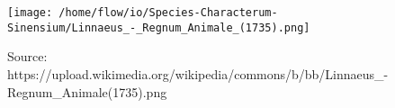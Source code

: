 \null\newpage{}\mktsIndent{}
\mktsBlankPage{}
\begin{landscape}
\begin{figure}%
\texttt{[image: /home/flow/io/Species-Characterum-Sinensium/Linnaeus\_-\_Regnum\_Animale\_(1735).png]}%
\caption[Source: https://upload.wikimedia.org/wikipedia/commons/b/bb/Linnaeus_-Regnum_Animale(1735).png]{%
{\mktsStyleItalic{}Source: https://upload.wikimedia.org/wikipedia/commons/b/bb/Linnaeus\_-\/}{\mktsStyleItalicsmallcapslower{}Regnum\_Animale\/}{\mktsStyleItalic{}(1735).png\/}}%
\end{figure}%


\end{landscape}

